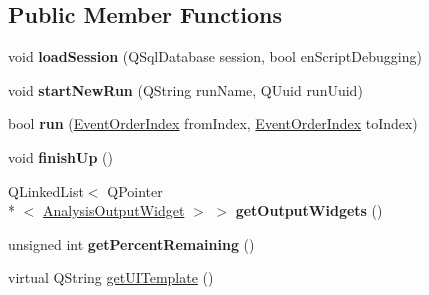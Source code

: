 \subsection*{Public Member Functions}
\begin{DoxyCompactItemize}
\item 
\hypertarget{class_picto_1_1_analysis_period_aa627b61b43c70ca92e2cc91718ca49be}{void {\bfseries load\-Session} (Q\-Sql\-Database session, bool en\-Script\-Debugging)}\label{class_picto_1_1_analysis_period_aa627b61b43c70ca92e2cc91718ca49be}

\item 
\hypertarget{class_picto_1_1_analysis_period_af9b1cc6c7d012d29f76b08d36a77a9fb}{void {\bfseries start\-New\-Run} (Q\-String run\-Name, Q\-Uuid run\-Uuid)}\label{class_picto_1_1_analysis_period_af9b1cc6c7d012d29f76b08d36a77a9fb}

\item 
\hypertarget{class_picto_1_1_analysis_period_aeb3f80b877890057e2c77b4204cf3ba7}{bool {\bfseries run} (\hyperlink{class_picto_1_1_event_order_index}{Event\-Order\-Index} from\-Index, \hyperlink{class_picto_1_1_event_order_index}{Event\-Order\-Index} to\-Index)}\label{class_picto_1_1_analysis_period_aeb3f80b877890057e2c77b4204cf3ba7}

\item 
\hypertarget{class_picto_1_1_analysis_period_a1a9eed6aa42cbbb861c0ea9dd176b7b1}{void {\bfseries finish\-Up} ()}\label{class_picto_1_1_analysis_period_a1a9eed6aa42cbbb861c0ea9dd176b7b1}

\item 
\hypertarget{class_picto_1_1_analysis_period_aa9320e6d0d7fb110c1be8763dc9a0032}{Q\-Linked\-List$<$ Q\-Pointer\\*
$<$ \hyperlink{class_picto_1_1_analysis_output_widget}{Analysis\-Output\-Widget} $>$ $>$ {\bfseries get\-Output\-Widgets} ()}\label{class_picto_1_1_analysis_period_aa9320e6d0d7fb110c1be8763dc9a0032}

\item 
\hypertarget{class_picto_1_1_analysis_period_a5db48ef247737543e8ed2975981ec705}{unsigned int {\bfseries get\-Percent\-Remaining} ()}\label{class_picto_1_1_analysis_period_a5db48ef247737543e8ed2975981ec705}

\item 
\hypertarget{class_picto_1_1_analysis_period_abf2777fe2a83cc3fd723713f50d4cb19}{virtual Q\-String \hyperlink{class_picto_1_1_analysis_period_abf2777fe2a83cc3fd723713f50d4cb19}{get\-U\-I\-Template} ()}\label{class_picto_1_1_analysis_period_abf2777fe2a83cc3fd723713f50d4cb19}


\end{DoxyCompactItemize}
